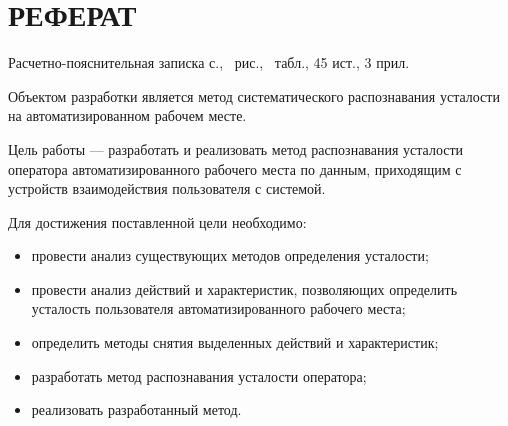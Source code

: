 \section*{РЕФЕРАТ}

Расчетно-пояснительная записка \pageref{LastPage} с., \totalfigures\ рис., \totaltables\ табл., 45 ист., 3 прил.

Объектом разработки является метод систематического распознавания ус\-талости на автоматизированном рабочем месте.

Цель работы --- разработать и реализовать метод распознавания усталости оператора автоматизированного рабочего места по данным, приходящим с устройств взаимодействия пользователя с системой.

Для достижения поставленной цели необходимо:
\begin{itemize}
\item провести анализ существующих методов определения усталости;
\item провести анализ действий и характеристик, позволяющих определить ус\-талость пользователя автоматизированного рабочего места;
\item определить методы снятия выделенных действий и характеристик;
\item разработать метод распознавания усталости оператора;
\item реализовать разработанный метод.
\end{itemize}

\pagebreak